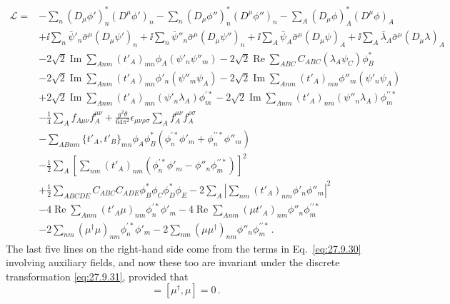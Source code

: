 \begin{equation}
  \begin{aligned}
  \mathcal{L}={}&
  -\sum_n(D_\mu\phi')_n^*(D^\mu\phi')_n
  -\sum_n(D_\mu\phi'')_n^*(D^\mu\phi'')_n
  -\sum_A(D_\mu\phi)_A^*(D^\mu\phi)_A
  \\
  &+\ii\sum_n\bar\psi'_n\bar\sigma^\mu(D_\mu\psi')_n
  +\ii\sum_n\bar\psi''_n\bar\sigma^\mu(D_\mu\psi'')_n
  +\ii\sum_A\bar\psi_A\bar\sigma^\mu(D_\mu\psi)_A
  +\ii\sum_A\bar\lambda_A\bar\sigma^\mu(D_\mu\lambda)_A
  \\
  &-2\sqrt{2}\operatorname{Im}\sum_{Anm}(t'_A)_{mn}\phi_A
    \left(\psi'_n\psi''_m\right)
  -2\sqrt{2}\operatorname{Re}\sum_{ABC}C_{ABC}
    \left(\lambda_A\psi_C\right)\phi_B^*
  \\
  &-2\sqrt{2}\operatorname{Im}\sum_{Anm}(t'_A)_{mn}\phi'_n
    \left(\psi''_m\psi_A\right)
  -2\sqrt{2}\operatorname{Im}\sum_{Anm}(t'_A)_{mn}\phi''_m
    \left(\psi'_n\psi_A\right)
  \\
  &+2\sqrt{2}\operatorname{Im}\sum_{Anm}(t'_A)_{mn}
    \left(\psi'_n\lambda_A\right)\phi_m^{\prime *}
  -2\sqrt{2}\operatorname{Im}\sum_{Anm}(t'_A)_{nm}
    \left(\psi''_n\lambda_A\right)
    \phi_m^{\prime\prime *}
  \\
  &-\frac14\sum_Af_{A\mu\nu}f_A^{\mu\nu}
  +\frac{g^2\theta}{64\pi^2}\epsilon_{\mu\nu\rho\sigma}
    \sum_Af_A^{\mu\nu}f_A^{\rho\sigma}
  \\
  &-\sum_{ABnm}\{t'_A,t'_B\}_{mn}\phi_A\phi_B^*
    \left(\phi_n^{\prime *}\phi'_m+\phi_n^{\prime\prime *}\phi''_m\right)
  \\
  &-\frac12\sum_A\left[
    \sum_{nm}(t'_A)_{nm}
    \left(\phi_n^{\prime *}\phi'_m-\phi''_n\phi_m^{\prime\prime *}\right)
  \right]^2
  \\
  &+\frac12\sum_{ABCDE}C_{ABC}C_{ADE}
    \phi_B^*\phi_C\phi_D^*\phi_E
  -2\sum_A\left|\sum_{nm}(t'_A)_{nm}\phi'_n\phi''_m\right|^2
  \\
  &-4\operatorname{Re}\sum_{Anm}(t'_A\mu)_{nm}\phi_n^{\prime *}\phi'_m
  -4\operatorname{Re}\sum_{Anm}(\mu t'_A)_{nm}
    \phi''_n\phi_m^{\prime\prime *}
  \\
  &-2\sum_{nm}(\mu^\dagger\mu)_{nm}\phi_n^{\prime *}\phi'_m
  -2\sum_{nm}(\mu\mu^\dagger)_{nm}\phi''_n\phi_m^{\prime\prime *}\,.
  \end{aligned}
  \tag{27.9.33}\label{eq:27.9.33}
\end{equation}
The last five lines on the right-hand side come from the terms in
Eq.~\eqref{eq:27.9.30} involving auxiliary fields, and now these too are
invariant under the discrete transformation \eqref{eq:27.9.31}, provided
that
\begin{equation}
  [t'_A,\mu]=[\mu^\dagger,\mu]=0\,.
  \tag{27.9.34}\label{eq:27.9.34}
\end{equation}

